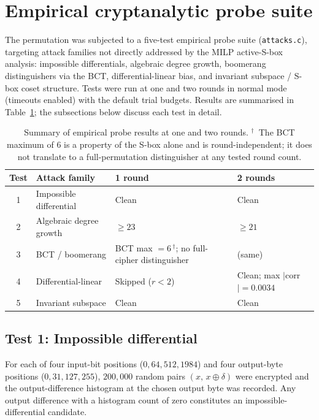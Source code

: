 \documentclass[11pt,a4paper]{article}
\begin{document}
\section{Empirical cryptanalytic probe suite}
\label{sec:attacks}

The permutation was subjected to a five-test empirical probe suite
(\texttt{attacks.c}), targeting attack families not directly addressed by the
MILP active-S-box analysis: impossible differentials, algebraic degree growth,
boomerang distinguishers via the BCT, differential-linear bias, and invariant
subspace / S-box coset structure.  Tests were run at one and two rounds in
normal mode (timeouts enabled) with the default trial budgets.  Results are
summarised in Table~\ref{tab:attacks}; the subsections below discuss each test
in detail.

\begin{table}[h]
\centering
\renewcommand{\arraystretch}{1.2}
\begin{tabular}{clp{3.5cm}p{4cm}}
  \toprule
  \textbf{Test} & \textbf{Attack family} & \textbf{1 round} & \textbf{2 rounds} \\
  \midrule
  1 & Impossible differential  & Clean            & Clean \\
  2 & Algebraic degree growth  & $\ge 23$         & $\ge 21$ \\
  3 & BCT / boomerang          & BCT max $= 6$\,$^\dagger$; no full-cipher distinguisher & (same) \\
  4 & Differential-linear      & Skipped ($r < 2$) & Clean; max $|$corr$| = 0.0034$ \\
  5 & Invariant subspace       & Clean            & Clean \\
  \bottomrule
\end{tabular}
\caption{Summary of empirical probe results at one and two rounds.
$^\dagger$~The BCT maximum of $6$ is a property of the S-box alone and is
round-independent; it does not translate to a full-permutation distinguisher at
any tested round count.}
\label{tab:attacks}
\end{table}

\subsection{Test 1: Impossible differential}

For each of four input-bit positions ($0, 64, 512, 1984$) and four output-byte
positions ($0, 31, 127, 255$), $200{,}000$ random pairs $(x,\,x \oplus \delta)$
were encrypted and the output-difference histogram at the chosen output byte was
recorded.  Any output difference with a histogram count of zero constitutes an
impossible-differential candidate.
\end{document}
